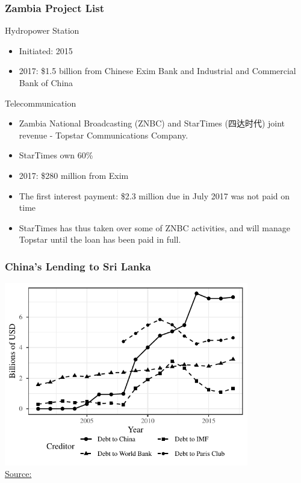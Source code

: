 \documentclass[mathserif]{beamer}
\begin{document}
    \begin{frame}
        \frametitle{Zambia Project List}
        Hydropower Station
        \begin{itemize}
            \item Initiated: 2015
            \item 2017: \$1.5 billion from Chinese Exim Bank and Industrial and Commercial Bank of China
        \end{itemize}
        Telecommunication
        \begin{itemize}
            \item Zambia National Broadcasting (ZNBC) and StarTimes (四达时代) joint revenue - Topstar Communications Company.
            \item StarTimes own 60\%
            \item 2017: \$280 million from Exim
            \item The first interest payment: \$2.3 million due in July 2017 was not paid on time
            \item StarTimes has thus taken over some of ZNBC activities, and will manage Topstar until the loan has been paid in full\citep{ofstad2019zambia}.
        \end{itemize}
    \end{frame}

    \begin{frame}[label = {sri_ts}]
        \frametitle{China's Lending to Sri Lanka}
        \begin{center}
            \includegraphics[width = 0.8\textwidth]{fig/ALL/Sri Lanka_debt_source.pdf}\\
            \small \hyperlink{sri_ds<2>}{Source: }\citet*{Horn-Reinhart-Trebesch-21}
        \end{center}
    \end{frame}
\end{document}
